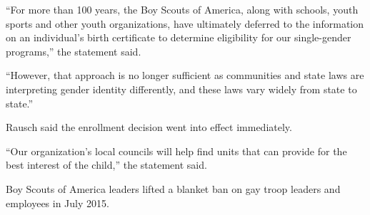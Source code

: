 “For more than 100 years, the Boy Scouts of America, along with schools, youth sports and other youth organizations, have ultimately deferred to the information on an individual’s birth certificate to determine eligibility for our single-gender programs,” the statement said.

“However, that approach is no longer sufficient as communities and state laws are interpreting gender identity differently, and these laws vary widely from state to state.”

Rausch said the enrollment decision went into effect immediately.

“Our organization’s local councils will help find units that can provide for the best interest of the child,” the statement said.

Boy Scouts of America leaders lifted a blanket ban on gay troop leaders and employees in July 2015.
